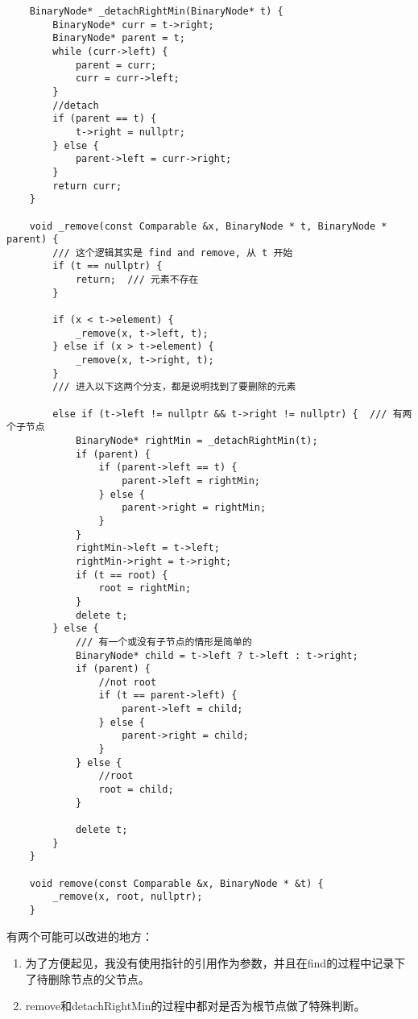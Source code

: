 \documentclass[UTF8]{ctexart}
\begin{document}
\lstset{language=C++} %
\begin{lstlisting}
    BinaryNode* _detachRightMin(BinaryNode* t) {
        BinaryNode* curr = t->right;
        BinaryNode* parent = t;
        while (curr->left) {
            parent = curr;
            curr = curr->left;
        }
        //detach
        if (parent == t) {
            t->right = nullptr;
        } else {
            parent->left = curr->right;
        }
        return curr;
    }

    void _remove(const Comparable &x, BinaryNode * t, BinaryNode * parent) {
        /// 这个逻辑其实是 find and remove, 从 t 开始
        if (t == nullptr) {
            return;  /// 元素不存在
        }
    
        if (x < t->element) {
            _remove(x, t->left, t);
        } else if (x > t->element) {
            _remove(x, t->right, t);
        } 
        /// 进入以下这两个分支，都是说明找到了要删除的元素
        
        else if (t->left != nullptr && t->right != nullptr) {  /// 有两个子节点
            BinaryNode* rightMin = _detachRightMin(t);
            if (parent) {
                if (parent->left == t) {
                    parent->left = rightMin;
                } else {
                    parent->right = rightMin;
                }
            }
            rightMin->left = t->left;
            rightMin->right = t->right;
            if (t == root) {
                root = rightMin;
            }
            delete t;
        } else {
            /// 有一个或没有子节点的情形是简单的
            BinaryNode* child = t->left ? t->left : t->right;
            if (parent) {
                //not root
                if (t == parent->left) {
                    parent->left = child;
                } else {
                    parent->right = child;
                }
            } else {
                //root
                root = child;
            }
            
            delete t;
        }
    }

    void remove(const Comparable &x, BinaryNode * &t) {
        _remove(x, root, nullptr);
    }
\end{lstlisting}


\par 有两个可能可以改进的地方：
\begin{enumerate}
    \item 为了方便起见，我没有使用指针的引用作为参数，并且在find的过程中记录下了待删除节点的父节点。
    \item remove和detachRightMin的过程中都对是否为根节点做了特殊判断。
\end{enumerate}
\end{document}

